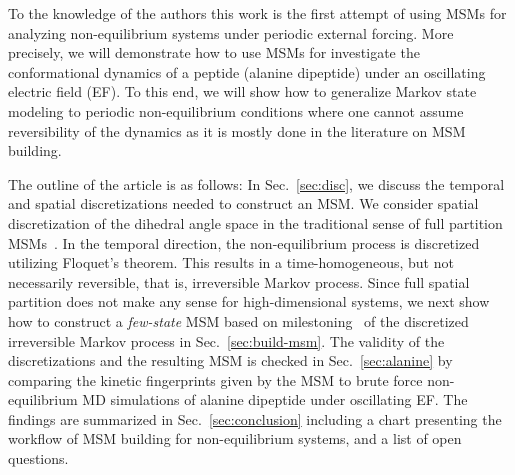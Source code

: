 \documentclass[aps, pre, preprint,unsortedaddress,a4paper,onecolumn,showkeys]{revtex4}
\begin{document}
To the knowledge of the authors this work is the first attempt of using MSMs for analyzing non-equilibrium systems under periodic external forcing.
More precisely, we will demonstrate how to use MSMs for investigate the conformational dynamics of a peptide (alanine dipeptide) under an oscillating electric field (EF).
To this end, we will show how to generalize Markov state modeling to periodic non-equilibrium conditions where one cannot assume reversibility of the dynamics as it is mostly done in the literature on MSM building.

The outline of the article is as follows: 
In Sec.~\ref{sec:disc}, we discuss the temporal and spatial
discretizations needed to construct an MSM. We consider spatial discretization
of the dihedral angle space in the traditional sense of full partition MSMs~\cite{pande2010everything,A19-29}.
In the temporal direction, the non-equilibrium process
is discretized utilizing Floquet's theorem. This results in a time-homogeneous, 
but not necessarily reversible, that is, irreversible Markov process. Since  full spatial partition does not make any sense
for high-dimensional systems, we next show how to construct a \emph{few-state} MSM based on milestoning~\cite{schuette2011markov,A19-29} of the discretized irreversible Markov process in Sec.~\ref{sec:build-msm}.
The validity of the discretizations and the resulting MSM is checked in Sec.~\ref{sec:alanine}
by comparing the kinetic fingerprints given by the MSM to brute force
non-equilibrium MD simulations of alanine dipeptide under oscillating EF.
The findings are summarized in Sec.~\ref{sec:conclusion} including a chart presenting
the workflow of MSM building for non-equilibrium systems, and a list of open questions.



\end{document}
